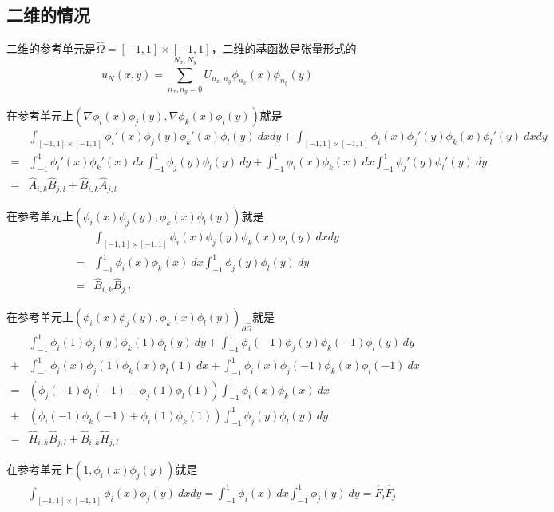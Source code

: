 \documentclass[UTF8,12pt]{article}
\begin{document}
\subsection{二维的情况}

二维的参考单元是$\hat{\Omega} = [-1,1] \times [-1,1]$，二维的基函数是张量形式的
$$ u_N(x,y) = \sum_{n_x,n_y = 0}^{N_x, N_y} U_{n_x,n_y} \phi_{n_x}(x) \phi_{n_y}(y) $$

在参考单元上$(\nabla \phi_i(x) \phi_j(y), \nabla \phi_k(x) \phi_l(y))$就是
\begin{align*}
& \int_{[-1,1] \times [-1,1]} \phi_i'(x) \phi_j(y) \phi_k'(x) \phi_l(y) \ dx dy + \int_{[-1,1] \times [-1,1]} \phi_i(x) \phi_j'(y) \phi_k(x) \phi_l'(y) \ dx dy \\
= & \int_{-1}^{1} \phi_i'(x) \phi_k'(x) \ dx \int_{-1}^{1} \phi_j(y) \phi_l(y) \ dy + \int_{-1}^{1} \phi_i(x) \phi_k(x) \ dx \int_{-1}^{1} \phi_j'(y) \phi_l'(y) \ dy \\
= & \hat{A}_{i,k} \hat{B}_{j,l} + \hat{B}_{i,k} \hat{A}_{j,l}
\end{align*}

在参考单元上$(\phi_i(x) \phi_j(y), \phi_k(x) \phi_l(y))$就是
\begin{align*}
& \int_{[-1,1] \times [-1,1]} \phi_i(x) \phi_j(y) \phi_k(x) \phi_l(y) \ dx dy \\
= & \int_{-1}^{1} \phi_i(x) \phi_k(x) \ dx \int_{-1}^{1} \phi_j(y) \phi_l(y) \ dy \\
= & \hat{B}_{i,k} \hat{B}_{j,l}
\end{align*}

在参考单元上$(\phi_i(x) \phi_j(y), \phi_k(x) \phi_l(y))_{\partial \hat{\Omega}}$就是
\begin{align*}
& \int_{-1}^{1} \phi_i(1) \phi_j(y) \phi_k(1) \phi_l(y) \ dy + \int_{-1}^{1} \phi_i(-1) \phi_j(y) \phi_k(-1) \phi_l(y) \ dy \\
+ & \int_{-1}^{1} \phi_i(x) \phi_j(1) \phi_k(x) \phi_l(1) \ dx + \int_{-1}^{1} \phi_i(x) \phi_j(-1) \phi_k(x) \phi_l(-1) \ dx \\
= & (\phi_j(-1) \phi_l(-1) + \phi_j(1) \phi_l(1)) \int_{-1}^{1} \phi_i(x) \phi_k(x) \ dx \\
+ & (\phi_i(-1) \phi_k(-1) + \phi_i(1) \phi_k(1)) \int_{-1}^{1} \phi_j(y) \phi_l(y) \ dy \\
= & \hat{H}_{i,k} \hat{B}_{j,l} + \hat{B}_{i,k} \hat{H}_{j,l}
\end{align*}

在参考单元上$(1, \phi_i(x) \phi_j(y))$就是
\begin{align*}
& \int_{[-1,1] \times [-1,1]} \phi_i(x) \phi_j(y) \ dx dy = \int_{-1}^{1} \phi_i(x) \ dx \int_{-1}^{1} \phi_j(y) \ dy = \hat{F}_{i} \hat{F}_{j}
\end{align*}
\end{document}
